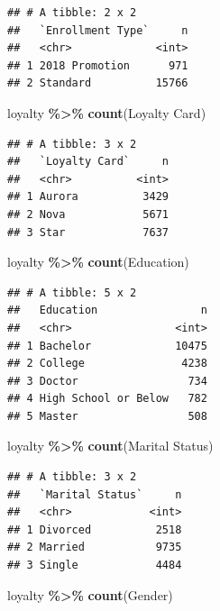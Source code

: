 \documentclass[
]{article}
\newenvironment{Shaded}{\begin{snugshade}}{\end{snugshade}}
\newcommand{\AttributeTok}[1]{\textcolor[rgb]{0.13,0.29,0.53}{#1}}
\newcommand{\FunctionTok}[1]{\textcolor[rgb]{0.13,0.29,0.53}{\textbf{#1}}}
\newcommand{\NormalTok}[1]{#1}
\newcommand{\SpecialCharTok}[1]{\textcolor[rgb]{0.81,0.36,0.00}{\textbf{#1}}}
\newcommand{\StringTok}[1]{\textcolor[rgb]{0.31,0.60,0.02}{#1}}
\begin{document}
\begin{verbatim}
## # A tibble: 2 x 2
##   `Enrollment Type`     n
##   <chr>             <int>
## 1 2018 Promotion      971
## 2 Standard          15766
\end{verbatim}

\begin{Shaded}
\begin{Highlighting}[]
\NormalTok{loyalty }\SpecialCharTok{\%\textgreater{}\%} \FunctionTok{count}\NormalTok{(}\StringTok{\textasciigrave{}}\AttributeTok{Loyalty Card}\StringTok{\textasciigrave{}}\NormalTok{)}
\end{Highlighting}
\end{Shaded}

\begin{verbatim}
## # A tibble: 3 x 2
##   `Loyalty Card`     n
##   <chr>          <int>
## 1 Aurora          3429
## 2 Nova            5671
## 3 Star            7637
\end{verbatim}

\begin{Shaded}
\begin{Highlighting}[]
\NormalTok{loyalty }\SpecialCharTok{\%\textgreater{}\%} \FunctionTok{count}\NormalTok{(Education)}
\end{Highlighting}
\end{Shaded}

\begin{verbatim}
## # A tibble: 5 x 2
##   Education                n
##   <chr>                <int>
## 1 Bachelor             10475
## 2 College               4238
## 3 Doctor                 734
## 4 High School or Below   782
## 5 Master                 508
\end{verbatim}

\begin{Shaded}
\begin{Highlighting}[]
\NormalTok{loyalty }\SpecialCharTok{\%\textgreater{}\%} \FunctionTok{count}\NormalTok{(}\StringTok{\textasciigrave{}}\AttributeTok{Marital Status}\StringTok{\textasciigrave{}}\NormalTok{)}
\end{Highlighting}
\end{Shaded}

\begin{verbatim}
## # A tibble: 3 x 2
##   `Marital Status`     n
##   <chr>            <int>
## 1 Divorced          2518
## 2 Married           9735
## 3 Single            4484
\end{verbatim}

\begin{Shaded}
\begin{Highlighting}[]
\NormalTok{loyalty }\SpecialCharTok{\%\textgreater{}\%} \FunctionTok{count}\NormalTok{(Gender)}
\end{Highlighting}
\end{Shaded}
\end{document}
